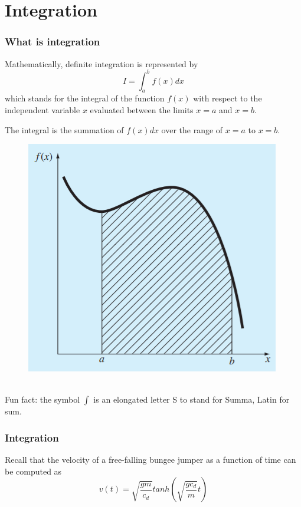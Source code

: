 \documentclass{if-beamer}
\begin{document}
\section{Integration}
\begin{frame}
	\frametitle{What is integration}
	\begin{minipage}{0.6\textwidth}
		Mathematically, definite integration is represented by 
		$$I = \int_{a}^{b} f(x)dx$$
		which stands for the integral of the function $f(x)$ with respect to the independent variable $x$ evaluated between the limits $x=a$ and $x=b$. \\\vspace{10pt}
		
		The integral is the summation of $f(x)dx$ over the range of $x=a$ to $x=b$. \\
	\end{minipage}
	\begin{minipage}{0.4\textwidth}
		\begin{figure}
			\centering
			\includegraphics[width=.95\textwidth]{figures/integralplot}
		\end{figure}
	\end{minipage}
	\\\vspace{0.5cm}
	Fun fact: the symbol $\int$ is an elongated letter S to stand for Summa, Latin for sum.
\end{frame}

\begin{frame}[t]
	\frametitle{Integration}
	Recall that the velocity of a free-falling bungee jumper as a function of time can be
	computed as
	$$v(t) = \sqrt{\frac{gm}{c_d}}tanh\left(\sqrt{\frac{gc_d}{m}}t\right) $$
\end{frame}
\end{document}
